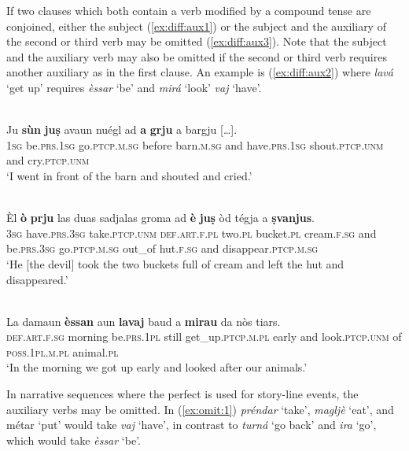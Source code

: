 If two clauses which both contain a verb modified by a compound tense are conjoined, either the subject (\ref{ex:diff:aux1}) or the subject and the auxiliary of the second or third verb may be omitted (\ref{ex:diff:aux3}). Note that the subject and the auxiliary verb may also be omitted if the second or third verb requires another auxiliary as in the first clause. An example is (\ref{ex:diff:aux2}) where \textit{lavá} `get up' requires \textit{èssar} `be' and \textit{mirá} `look' \textit{vaj} `have'.

\ea\label{ex:diff:aux1}
 {\citealt[69]{Büchli1966}}\\
\gll Ju \textbf{sùn} \textbf{juṣ} avaun nuégl ad \textbf{a} \textbf{grju} a bargju […].\\
     \textsc{1sg}  be.\textsc{prs.1sg}  go.\textsc{ptcp.m.sg} before barn.\textsc{m.sg} and have.\textsc{prs.1sg} shout.\textsc{ptcp.unm} and cry.\textsc{ptcp.unm}\\
\glt `I went in front of the barn and shouted and cried.'
\z

\ea\label{ex:diff:aux3}
\\
\gll Èl \textbf{ò} \textbf{prju} las duas sadjalas groma ad \textbf{è} \textbf{juṣ} òd tégja a \textbf{ṣvanjus}.\\
\textsc{3sg}  have.\textsc{prs.3sg} take.\textsc{ptcp.unm} \textsc{def.art.f.pl} two.\textsc{pl} bucket.\textsc{pl}  cream.\textsc{f.sg} and be.\textsc{prs.3sg} go.\textsc{ptcp.m.sg} out\_of hut.\textsc{f.sg} and disappear.\textsc{ptcp.m.sg}\\
\glt `He [the devil] took the two buckets full of cream and left the hut and disappeared.'
\z

\ea\label{ex:diff:aux2}
 {\citealt[68]{Büchli1966}}\\
\gll La damaun \textbf{èssan} aun \textbf{lavaj} baud a \textbf{mirau} da nòs tiars.\\
\textsc{def.art.f.sg}  morning be.\textsc{prs.1pl} still get\_up.\textsc{ptcp.m.pl} early and look.\textsc{ptcp.unm} of \textsc{poss.1pl.m.pl} animal.\textsc{pl}\\
\glt `In the morning we got up early and looked after our animals.'
\z

In narrative sequences where the perfect is used for story-line events, the auxiliary verbs may be omitted. In (\ref{ex:omit:1}) \textit{préndar} `take', \textit{magljè} `eat', and métar `put' would take \textit{vaj} `have', in contrast to \textit{turná} `go back' and \textit{ira} `go', which would take \textit{èssar} `be'.


